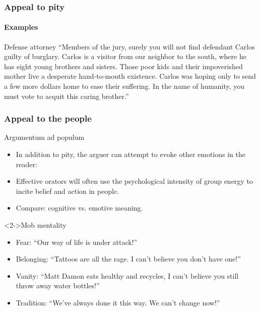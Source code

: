 \documentclass[10pt,letterpaper,xcolor=dvipsnames]{beamer}
\begin{document}
\begin{frame}
  \frametitle{Appeal to pity}
  \framesubtitle{Examples}
  
  \begin{block}{Defense attorney}
  ``Members of the jury, surely you will not find defendant Carlos guilty of burglary.  Carlos is a visitor from our neighbor to the south, where he has eight young brothers and sisters.  Those poor kids and their impoverished mother live a desperate hand-to-mouth existence.  Carlos was hoping only to send a few more dollars home to ease their suffering.  In the name of humanity, you must vote to acquit this caring brother.''
  \end{block}
  
  
\end{frame}

\begin{frame}
  \frametitle{Appeal to the people}
  
  \begin{block}{Argumentum ad populum}
    \begin{itemize}
      \item In addition to pity, the arguer can attempt to evoke other emotions in the reader:
      \item Effective orators will often use the psychological intensity of group energy to incite belief and action in people.
      \item Compare: cognitive vs. emotive meaning.
    \end{itemize}
  \end{block}
  
  \begin{block}<2->{Mob mentality}
    \begin{itemize}
      \item Fear: ``Our way of life is under attack!''
      \item Belonging: ``Tattoos are all the rage.  I can't believe you don't have one!'' 
      \item Vanity: ``Matt Damon eats healthy and recycles,  I can't believe you still throw away water bottles!''
      \item Tradition: ``We've always done it this way.  We can't change now!''
    \end{itemize}
  \end{block}
  
\end{frame}
\end{document}
